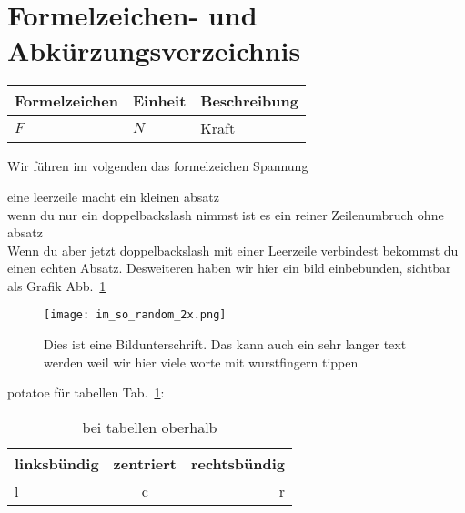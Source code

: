 \documentclass[../main.tex]{subfiles}
\begin{document}
    \section{Formelzeichen- und Abkürzungsverzeichnis}
    \begin{tabular}{lll}
        Formelzeichen & Einheit & Beschreibung
        \\
        \hline 
        $F$ & $N$ & Kraft
        
    \end{tabular}
    \newpage
    \lipsum[1-2]
    Wir führen im volgenden das formelzeichen \gls{Spannung} 
    
    eine leerzeile macht ein kleinen absatz\\
    wenn du nur ein doppelbackslash nimmst ist es ein reiner Zeilenumbruch ohne absatz\\
    
    Wenn du aber jetzt doppelbackslash mit einer Leerzeile verbindest bekommst du einen echten Absatz.
    Desweiteren haben wir hier ein bild einbebunden, sichtbar als Grafik Abb.~\ref{fig:einBild}
    
    \begin{figure}[H]
    	\centering
    	\texttt{[image: im\_so\_random\_2x.png]}
    	\caption[nur kurz fürs verzeichnis]{Dies ist eine Bildunterschrift. Das kann auch ein sehr langer text werden weil wir hier viele worte mit wurstfingern tippen}
    	\label{fig:einBild}
    \end{figure}
    potatoe
    für tabellen Tab.~\ref{tab:blabla}:
    
    \begin{table}[H]
    	\caption[kurz]{bei tabellen oberhalb}
    	\label{tab:blabla}
    	\centering
    	\begin{tabular}{|l|c|r|}
    		\hline
    		linksbündig & zentriert& rechtsbündig\\
    		\hline
    		l & c&r\\
    		\hline\hline
    	\end{tabular}
    \end{table}
    
\end{document}
